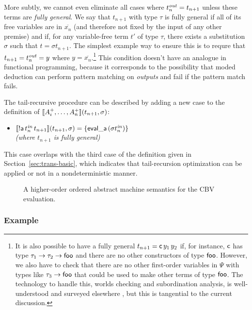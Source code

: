 More subtly, we cannot even eliminate all cases where $t^{\it out}_n =
t_{n+1}$ unless these terms are {\it fully general}. We say that
$t_{n+1}$ with type $\tau$ is fully general if all of its free
variables are in $\overline{x_n}$ (and therefore not fixed by the
input of any other premise) and if, for any variable-free term $t'$ of
type $\tau$, there exists a substitution $\sigma$ such that $t =
{\sigma}t_{n+1}$. The simplest example way to ensure this is to requre
that $t_{n+1} = t^{\it out}_n = y$ where $y =
\overline{x_n}$.\footnote{It is also possible to have a fully general
  $t_{n+1} = {\sf c}\,y_1\,y_2$ if, for instance, ${\sf c}$ has type
  $\tau_1 \rightarrow \tau_2 \rightarrow {\sf foo}$ and there are no
  other constructors of type ${\sf foo}$. However, we also have to
  check that there are no other first-order variables in $\Psi$ with
  types like $\tau_3 \rightarrow {\sf foo}$ that could be used to make
  other terms of type ${\sf foo}$. The technology to handle this,
  worlds checking and subordination analysis, is well-understood and
  surveyed elsewhere \cite{harper07mechanizing}, but this is
  tangential to the current discussion.} This condition doesn't have
an analogue in functional programming, because it corresponds to the
possibility that moded deduction can perform pattern
matching on {\it outputs} and fail if the pattern match fails.

The tail-recursive procedure can be described by adding a new 
case to the definition of 
$\llbracket {A^+_i,\ldots,A^+_n} \rrbracket({t_{n+1}},{\sigma})$:

\begin{itemize}
\item $\llbracket {{!}{\sf a}\,t^{\it in}_n\,t_{n+1}} \rrbracket({t_{n+1}},{\sigma}) 
  = \{{\sf eval\_a}\,({\sigma}{t^{\it in}_n})\}$
\\
  {\it (where $t_{n+1}$ is fully general)}
\end{itemize}
This case overlaps with the third case of the definition given
in Section~\ref{sec:trans-basic}, which indicates that tail-recursion
optimization can be applied or not in a nondeterministic manner.

\begin{figure}
\caption{A higher-order ordered abstract machine semantics for the CBV
  evaluation.}
\label{fig:cbv-ev-ssos-tail}
\end{figure}

\subsubsection{Example}

